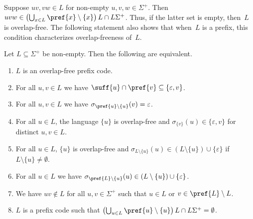 Suppose $uv, vw \in L$ for non-empty $u,v,w \in \Sigma^+$.
Then $uvw \in \left(\bigcup_{x \in L} \pref{x}\setminus\{x\} \right) L \cap L\Sigma^+$. Thus, if the latter
set is empty, then~$L$ is overlap-free. The following statement also shows that when~$L$
is a prefix, this condition characterizes overlap-freeness of~$L$.

\begin{proposition} \label{constrsync:prop:overlap-free-prefix}
Let $L \subseteq \Sigma^+$ be non-empty. Then the following are equivalent.
\begin{enumerate}		
\item \label{constrsync:prop:overlap-free-prefix:1xx} $L$ is an overlap-free prefix code.

\item \label{constrsync:prop:overlap-free-prefix:2xx} For all $u,v \in L$ we have $\suff{u} \cap \pref{v} \subseteq \{\varepsilon, v\}$.

\item  \label{constrsync:prop:overlap-free-prefix:2ax} For all $u,v \in L$ we have $\sigma_{\pref{u}\setminus\{u\}}(v) = \varepsilon$.		

\item  \label{constrsync:prop:overlap-free-prefix:2bx} For all $u \in L$, the language $\{u\}$ is overlap-free and 
$\sigma_{\{v\}}(u) \in \{\varepsilon, v\}$ for distinct $u,v \in L$.

\item \label{constrsync:prop:overlap-free-prefix:8}  For all $u \in L$, $\{u\}$ is overlap-free
and $\sigma_{L\setminus\{u\}}(u) \in (L \setminus\{u\}) \cup \{\varepsilon\}$
if $L \setminus\{u\} \ne \emptyset$.		

\item \label{constrsync:prop:overlap-free-prefix:5ax} For all $u \in L$ we have 
$\sigma_{\pref{L} \setminus \{u\}}(u) \in ( L \setminus \{u\} ) \cup \{\varepsilon\}$.

\item \label{constrsync:prop:overlap-free-prefix:3yx} 
We have $uv \notin L$ for all $u,v \in \Sigma^+$ such that $u \in L$ or $v \in \pref{L} \setminus L$.

\item \label{constrsync:prop:overlap-free-prefix:2axy} $L$ is a prefix code
such that $\left(\bigcup_{u \in L} \pref{u}\setminus\{u\} \right) L \cap L\Sigma^+ = \emptyset$.
\end{enumerate}
\end{proposition}
